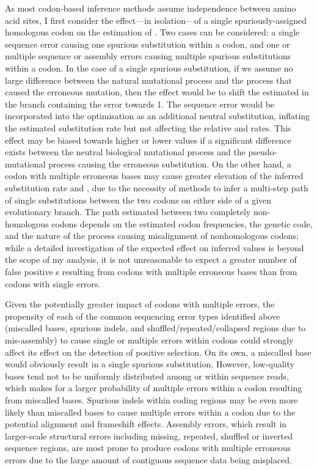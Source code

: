As most codon-based inference methods assume independence between
amino acid sites, I first consider the effect---in isolation---of a
single spuriously-assigned homologous codon on the \ml estimation of
\omg. Two cases can be considered: a single sequence error causing
one spurious substitution within a codon, and one or multiple sequence
or assembly errors causing multiple spurious substitutions within a
codon. In the case of a single spurious substitution, if we assume no
large difference between the natural mutational process and the
process that caused the erroneous mutation, then the effect would be
to shift the estimated \omg in the branch containing the error
towards 1. The sequence error would be incorporated into the \ml
optimisation as an additional neutral substitution, inflating the
estimated substitution rate but not affecting the relative \nsyn and
\syn rates. This effect may be biased towards higher or lower \omg
values if a significant difference exists between the neutral
biological mutational process and the pseudo-mutational process
causing the erroneous substitution. On the other hand, a codon with
multiple erroneous bases may cause greater elevation of the inferred
substitution rate and \omg, due to the necessity of \ml methods to
infer a multi-step path of single substitutions between the two codons
on either side of a given evolutionary branch. The path estimated
between two completely non-homologous codons depends on the estimated
codon frequencies, the genetic code, and the nature of the process
causing misalignment of nonhomologous codons; while a detailed
investigation of the expected effect on inferred \omg values is
beyond the scope of my analysis, it is not unreasonable to expect a
greater number of false positive \pss{}s resulting from codons with
multiple erroneous bases than from codons with single errors.

Given the potentially greater impact of codons with multiple errors,
the propensity of each of the common sequencing error types identified
above (miscalled bases, spurious indels, and
shuffled/repeated/collapsed regions due to mis-assembly) to cause
single or multiple errors within codons could strongly affect its
effect on the detection of positive selection. On its own, a miscalled
base would obviously result in a single spurious
substitution. However, low-quality bases tend not to be uniformly
distributed among or within sequence reads, which makes for a larger
probability of multiple errors within a codon resulting from miscalled
bases. Spurious indels within coding regions may be even more likely
than miscalled bases to cause multiple errors within a codon due to
the potential alignment and frameshift effects. Assembly errors, which
result in larger-scale structural errors including missing, repeated,
shuffled or inverted sequence regions, are most prone to produce
codons with multiple erroneous errors due to the large amount of
contiguous sequence data being misplaced.

